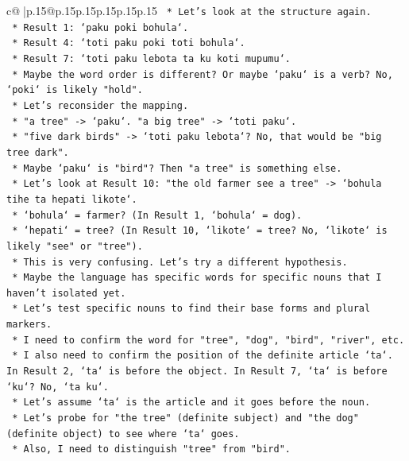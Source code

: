 \documentclass{article}
\begin{document}
{\begin{supertabular}{c@{$\;$}|p{.15\linewidth}@{}p{.15\linewidth}p{.15\linewidth}p{.15\linewidth}p{.15\linewidth}p{.15\linewidth}}
{{{\texttt{        *   Let's look at the structure again.} \\
\texttt{        *   Result 1: `paku poki bohula`.} \\
\texttt{        *   Result 4: `toti paku poki toti bohula`.} \\
\texttt{        *   Result 7: `toti paku lebota ta ku koti mupumu`.} \\
\texttt{        *   Maybe the word order is different? Or maybe `paku` is a verb? No, `poki` is likely "hold".} \\
\texttt{        *   Let's reconsider the mapping.} \\
\texttt{        *   "a tree" {-}> `paku`. "a big tree" {-}> `toti paku`.} \\
\texttt{        *   "five dark birds" {-}> `toti paku lebota`? No, that would be "big tree dark".} \\
\texttt{        *   Maybe `paku` is "bird"? Then "a tree" is something else.} \\
\texttt{        *   Let's look at Result 10: "the old farmer see a tree" {-}> `bohula tihe ta hepati likote`.} \\
\texttt{            *   `bohula` = farmer? (In Result 1, `bohula` = dog).} \\
\texttt{            *   `hepati` = tree? (In Result 10, `likote` = tree? No, `likote` is likely "see" or "tree").} \\
\texttt{            *   This is very confusing. Let's try a different hypothesis.} \\
\texttt{            *   Maybe the language has specific words for specific nouns that I haven't isolated yet.} \\
\texttt{            *   Let's test specific nouns to find their base forms and plural markers.} \\
\texttt{            *   I need to confirm the word for "tree", "dog", "bird", "river", etc.} \\
\texttt{            *   I also need to confirm the position of the definite article `ta`. In Result 2, `ta` is before the object. In Result 7, `ta` is before `ku`? No, `ta ku`.} \\
\texttt{            *   Let's assume `ta` is the article and it goes before the noun.} \\
\texttt{            *   Let's probe for "the tree" (definite subject) and "the dog" (definite object) to see where `ta` goes.} \\
\texttt{            *   Also, I need to distinguish "tree" from "bird".} \\
}}}
\end{supertabular}}
\end{document}
